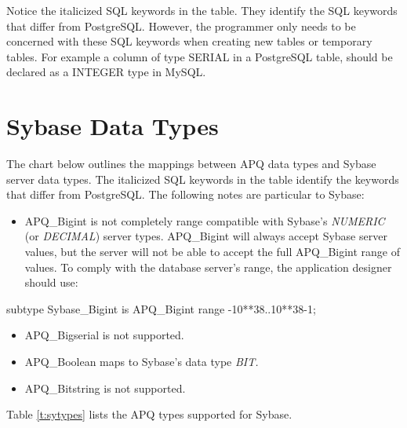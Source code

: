 \documentclass[english,letterpaper]{book}
\begin{document}
Notice the italicized SQL keywords in the table. They identify the
SQL keywords that differ from PostgreSQL. However, the programmer
only needs to be concerned with these SQL keywords when creating new
tables or temporary tables. For example a column of type SERIAL in
a PostgreSQL table, should be declared as a INTEGER type in MySQL.


\section{Sybase Data Types}

The chart below outlines the mappings between APQ data types and Sybase
server data types. The italicized SQL keywords
 in the table identify
the keywords that differ from PostgreSQL. The following notes are
particular to Sybase:

\begin{itemize}	
   \item APQ\_Bigint is not completely range compatible with Sybase's \emph{NUMERIC}
         (or \emph{DECIMAL}) server types. APQ\_Bigint will always accept Sybase server
         values, but the server will not be able to accept the full APQ\_Bigint range of values.
         To comply with the database server's range,
         the application designer should use:
\end{itemize}

\begin{Code}
subtype Sybase_Bigint is APQ_Bigint
   range -10**38..10**38-1;
\end{Code}

\begin{itemize}
   \item APQ\_Bigserial is not supported.
   \item APQ\_Boolean  maps to Sybase's data type \emph{BIT.}
   \item APQ\_Bitstring is not supported.
\end{itemize}

Table \ref{t:sytypes} lists the APQ types supported for Sybase.
\end{document}
